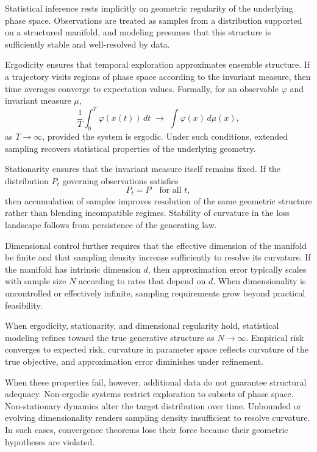 \documentclass[12pt]{book}
\begin{document}
Statistical inference rests implicitly on geometric regularity of the underlying phase space. Observations are treated as samples from a distribution supported on a structured manifold, and modeling presumes that this structure is sufficiently stable and well-resolved by data.

Ergodicity ensures that temporal exploration approximates ensemble structure. If a trajectory visits regions of phase space according to the invariant measure, then time averages converge to expectation values. Formally, for an observable $\varphi$ and invariant measure $\mu$,
\[
\frac{1}{T} \int_0^T \varphi(x(t)) \, dt
\;\longrightarrow\;
\int \varphi(x)\, d\mu(x),
\]
as $T \to \infty$, provided the system is ergodic. Under such conditions, extended sampling recovers statistical properties of the underlying geometry.

Stationarity ensures that the invariant measure itself remains fixed. If the distribution $P_t$ governing observations satisfies
\[
P_t = P
\quad \text{for all } t,
\]
then accumulation of samples improves resolution of the same geometric structure rather than blending incompatible regimes. Stability of curvature in the loss landscape follows from persistence of the generating law.

Dimensional control further requires that the effective dimension of the manifold be finite and that sampling density increase sufficiently to resolve its curvature. If the manifold has intrinsic dimension $d$, then approximation error typically scales with sample size $N$ according to rates that depend on $d$. When dimensionality is uncontrolled or effectively infinite, sampling requirements grow beyond practical feasibility.

When ergodicity, stationarity, and dimensional regularity hold, statistical modeling refines toward the true generative structure as $N \to \infty$. Empirical risk converges to expected risk, curvature in parameter space reflects curvature of the true objective, and approximation error diminishes under refinement.

When these properties fail, however, additional data do not guarantee structural adequacy. Non-ergodic systems restrict exploration to subsets of phase space. Non-stationary dynamics alter the target distribution over time. Unbounded or evolving dimensionality renders sampling density insufficient to resolve curvature. In such cases, convergence theorems lose their force because their geometric hypotheses are violated.
\end{document}
